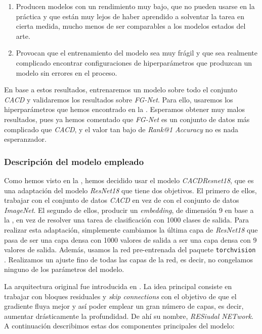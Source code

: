 \begin{enumerate}
    \item Producen modelos con un rendimiento muy bajo, que no pueden usarse en la práctica y que están muy lejos de haber aprendido a solventar la tarea en cierta medida, mucho menos de ser comparables a los modelos estados del arte.
    \item Provocan que el entrenamiento del modelo sea muy frágil y que sea realmente complicado encontrar configuraciones de hiperparámetros que produzcan un modelo sin errores en el proceso.
\end{enumerate}

En base a estos resultados, entrenaremos un modelo sobre todo el conjunto \textit{CACD} y validaremos los resultados sobre \textit{FG-Net}. Para ello, usaremos los hiperparámetros que hemos encontrado en la . Esperamos obtener muy malos resultados, pues ya hemos comentado que \textit{FG-Net} es un conjunto de datos más complicado que \textit{CACD}, y el valor tan bajo de \textit{Rank@1 Accuracy} no es nada esperanzador.

\subsubsection{Descripción del modelo empleado} \label{isec:explicacion_modelo}

Como hemos visto en la , hemos decidido usar el modelo \textit{CACDResnet18}, que es una adaptación del modelo \textit{ResNet18} que tiene dos objetivos. El primero de ellos, trabajar con el conjunto de datos \textit{CACD} en vez de con el conjunto de datos \textit{ImageNet}. El segundo de ellos, producir un \textit{embedding}, de dimensión 9 en base a la , en vez de resolver una tarea de clasificación con 1000 clases de salida. Para realizar esta adaptación, simplemente cambiamos la última capa de \textit{ResNet18} que pasa de ser una capa densa con 1000 valores de salida a ser una capa densa con 9 valores de salida. Además, usamos la red pre-entrenada del paquete \lstinline{torchvision} \cite{informatica:resnet18_torchvision}. Realizamos un ajuste fino de todas las capas de la red, es decir, no congelamos ninguno de los parámetros del modelo.

La arquitectura original fue introducida en \cite{informatica:resnet_original_paper}. La idea principal consiste en trabajar con bloques residuales y \textit{skip connections} con el objetivo de que el gradiente fluya mejor y así poder emplear un gran número de capas, es decir, aumentar drásticamente la profundidad. De ahí su nombre, \textit{RESiudal NETwork}. A continuación describimos estas dos componentes principales del modelo:

